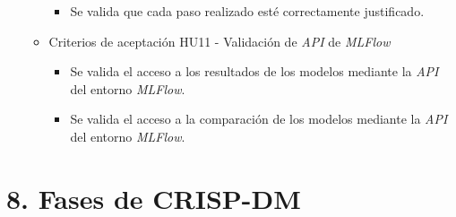 \documentclass[
11pt, %
]{charter}
\begin{document}
\begin{itemize}
\begin{itemize}
\begin{itemize}
            \item Se valida que cada paso realizado esté correctamente justificado.
        \end{itemize}
      \item Criterios de aceptación HU11 - Validación de \textit{API} de \textit{MLFlow}
        \begin{itemize}
            \item Se valida el acceso a los resultados de los modelos mediante la \textit{API} del entorno \textit{MLFlow}.
            \item Se valida el acceso a la comparación de los modelos mediante la \textit{API} del entorno \textit{MLFlow}.
        \end{itemize}
    \end{itemize}
\end{itemize}

\section{8. Fases de CRISP-DM}
\end{document}
